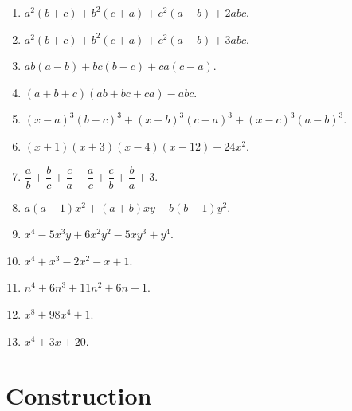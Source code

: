 \documentclass[11pt, a4paper]{article}
\begin{document}
\begin{enumerate}
	\item $ a^2(b+c) + b^2(c+a) + c^2(a+b) + 2abc $.

	\item $ a^2(b+c) + b^2(c+a) + c^2(a+b) + 3abc $.

	\item $ ab(a-b) + bc(b-c) + ca(c-a) $.

	\item $ (a+b+c)(ab+bc+ca) - abc $.
	
	\item $ (x-a)^3 (b-c)^3 + (x-b)^3 (c-a)^3 + (x-c)^3 (a-b)^3 $.

	\item $ (x+1) (x+3) (x-4) (x-12) - 24x^2 $.
	
	\item $ \dfrac{a}{b} + \dfrac{b}{c} + \dfrac{c}{a} + \dfrac{a}{c} + \dfrac{c}{b} + \dfrac{b}{a} + 3 $.
	
	\item $ a(a+1)x^2 + (a+b)xy - b(b-1)y^2 $.
	
	\item $ x^4 - 5x^3y + 6x^2y^2 - 5xy^3 + y^4  $.
	
	\item $ x^4 + x^3 - 2x^2 - x + 1  $.
	
	\item $ n^4 + 6n^3 + 11n^2 + 6n + 1 $.
	
	\item $ x^8 + 98x^4 + 1 $.

	\item $ x^4 + 3x +20 $.



\end{enumerate}





\section{Construction}
\end{document}
